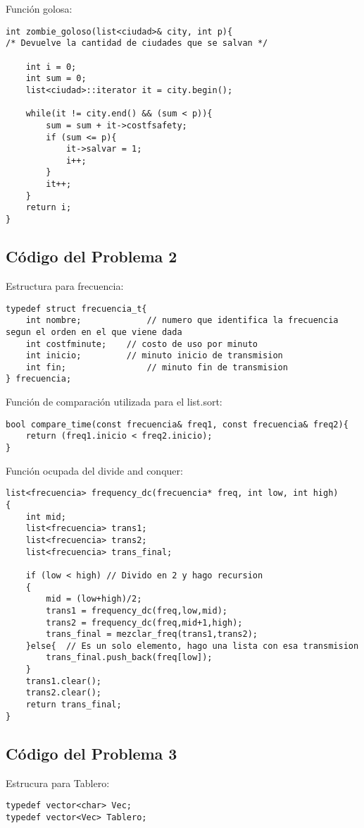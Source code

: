 \documentclass[a4paper]{article}
\begin{document}
\vspace*{0.5cm}

Función golosa:
\begin{lstlisting}
int zombie_goloso(list<ciudad>& city, int p){
/* Devuelve la cantidad de ciudades que se salvan */

	int i = 0;
	int sum = 0;
	list<ciudad>::iterator it = city.begin();
    
    while(it != city.end() && (sum < p)){
		sum = sum + it->costfsafety;
		if (sum <= p){
			it->salvar = 1;
			i++;
		}
		it++;
	}
	return i;
}
\end{lstlisting}

\subsection{Código del Problema 2}
Estructura para frecuencia:
\begin{lstlisting}
typedef struct frecuencia_t{
	int nombre; 			// numero que identifica la frecuencia segun el orden en el que viene dada
	int costfminute;  	// costo de uso por minuto
    int inicio;			// minuto inicio de transmision
    int fin;				// minuto fin de transmision
} frecuencia;
\end{lstlisting}

\vspace*{0.5cm}

Función de comparación utilizada para el list.sort:
\begin{lstlisting}
bool compare_time(const frecuencia& freq1, const frecuencia& freq2){
	return (freq1.inicio < freq2.inicio);
}
\end{lstlisting}

Función ocupada del divide and conquer:
\begin{lstlisting}
list<frecuencia> frequency_dc(frecuencia* freq, int low, int high)
{
	int mid;
	list<frecuencia> trans1;
	list<frecuencia> trans2;
	list<frecuencia> trans_final;
	
    if (low < high)	// Divido en 2 y hago recursion
    {
        mid = (low+high)/2;
        trans1 = frequency_dc(freq,low,mid);
        trans2 = frequency_dc(freq,mid+1,high);
		trans_final = mezclar_freq(trans1,trans2);
    }else{	// Es un solo elemento, hago una lista con esa transmision
		trans_final.push_back(freq[low]);
	}
	trans1.clear();
	trans2.clear();
    return trans_final;
}
\end{lstlisting}

\subsection{Código del Problema 3}
Estrucura para Tablero:
\begin{lstlisting}
typedef vector<char> Vec;
typedef vector<Vec> Tablero;
\end{lstlisting}
\end{document}
